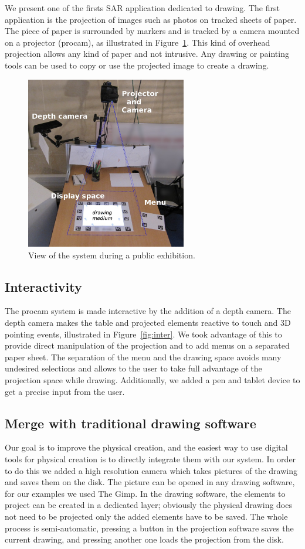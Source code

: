 \documentclass{article}
\begin{document}
We present one of the firsts SAR application dedicated to drawing. The first application is the projection of images such as photos on tracked sheets of paper. The piece of paper is surrounded by markers and is tracked by a camera mounted on a projector (procam), as illustrated in Figure~\ref{fig:system}.
This kind of overhead projection allows any kind of paper and not intrusive. Any drawing or painting tools can be used to  copy or use the projected image to create a drawing. 

\begin{figure}[!b]
\centering \includegraphics[width = 70mm]{global}
\caption{View of the system during a public exhibition.} 
\label{fig:system}
\end{figure}

\subsection{Interactivity}

The procam system is made interactive by the addition of a depth camera. The depth camera makes the table and projected elements reactive to touch and 3D pointing events, illustrated in Figure~\ref{fig:inter}. We took advantage of this to provide direct manipulation of the projection and to add menus on a separated paper sheet. The separation of the menu and the drawing space avoids many undesired selections and allows to the user to take full advantage of the projection space while drawing. Additionally, we added a pen and tablet device to get a precise input from the user. 

\subsection{Merge with traditional drawing software}
Our goal is to improve the physical creation, and the easiest way to use digital tools for physical creation is to directly integrate them with our system. In order to do this we added a high resolution camera which takes pictures of the drawing and saves them on the disk. The picture can be opened in any drawing software, for our examples we used The Gimp. In the drawing software, the elements to project can be created in a dedicated layer; obviously the physical drawing does not need to be projected only the added elements have to be saved. The whole process is semi-automatic, pressing a button in the projection software saves the current drawing, and pressing another one loads the projection from the disk. 
\end{document}

